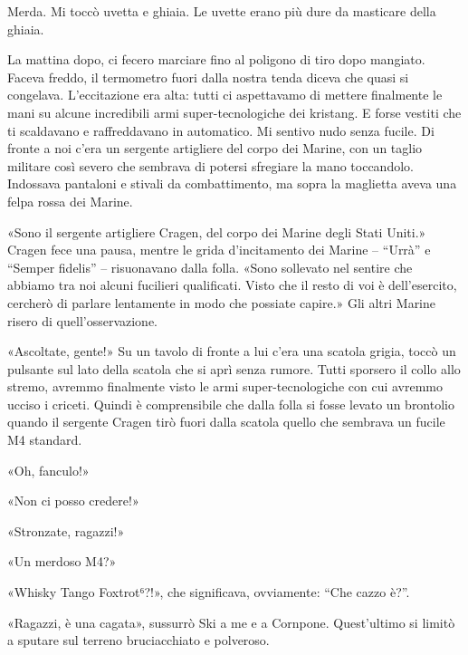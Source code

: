 Merda. Mi toccò uvetta e ghiaia. Le uvette erano più dure da masticare
della ghiaia.

\hfill\break

La mattina dopo, ci fecero marciare fino al poligono di tiro dopo
mangiato. Faceva freddo, il termometro fuori dalla nostra tenda diceva
che quasi si congelava. L'eccitazione era alta: tutti ci aspettavamo di
mettere finalmente le mani su alcune incredibili armi super-tecnologiche
dei kristang. E forse vestiti che ti scaldavano e raffreddavano in
automatico. Mi sentivo nudo senza fucile. Di fronte a noi c'era un
sergente artigliere del corpo dei Marine, con un taglio militare così
severo che sembrava di potersi sfregiare la mano toccandolo. Indossava
pantaloni e stivali da combattimento, ma sopra la maglietta aveva una
felpa rossa dei Marine.

«Sono il sergente artigliere Cragen, del corpo dei Marine degli Stati
Uniti.» Cragen fece una pausa, mentre le grida d'incitamento dei Marine
-- ``Urrà'' e ``Semper fidelis'' -- risuonavano dalla folla. «Sono
sollevato nel sentire che abbiamo tra noi alcuni fucilieri qualificati.
Visto che il resto di voi è dell'esercito, cercherò di parlare
lentamente in modo che possiate capire.» Gli altri Marine risero di
quell'osservazione.

«Ascoltate, gente!» Su un tavolo di fronte a lui c'era una scatola
grigia, toccò un pulsante sul lato della scatola che si aprì senza
rumore. Tutti sporsero il collo allo stremo, avremmo finalmente visto le
armi super-tecnologiche con cui avremmo ucciso i criceti. Quindi è
comprensibile che dalla folla si fosse levato un brontolio quando il
sergente Cragen tirò fuori dalla scatola quello che sembrava un fucile
M4 standard.

«Oh, fanculo!»

«Non ci posso credere!»

«Stronzate, ragazzi!»

«Un merdoso M4?»

«Whisky Tango Foxtrot⁶?!», che significava, ovviamente: ``Che cazzo
è?''.

«Ragazzi, è una cagata», sussurrò Ski a me e a Cornpone. Quest'ultimo si
limitò a sputare sul terreno bruciacchiato e polveroso.

